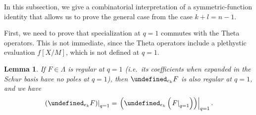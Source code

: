 \documentclass[reqno]{amsart}
\theoremstyle{plain}
\newtheorem{lemma}[theorem]{Lemma}
\theoremstyle{definition}
\theoremstyle{remark}
\let\oldTheta\Theta
\let\Theta\undefined
\DeclareMathOperator{\Theta}{\oldTheta}
\newcommand{\<}{\langle}
\renewcommand{\>}{\rangle}
\begin{document}
In this subsection, we give a combinatorial interpretation of a symmetric-function identity that allows us to prove the general case from the case $k+l=n-1$.


First, we need to prove that specialization at $q=1$ commutes with the Theta operators. This is not immediate, since the Theta operators include a plethystic evaluation $f[X/M]$, which is not defined at $q=1$.

\begin{lemma}
    \label{lem:theta_commutes_with_q1_eval}
    If $F \in \Lambda$ is regular at $q=1$ (i.e.\ its coefficients when expanded in the Schur basis have no poles at $q=1$), then $\Theta_{e_k} F$ is also regular at $q=1$, and we have
    \[ \left. \left( \Theta_{e_k} F \right) \right\rvert_{q=1} = \left. \left( \Theta_{e_k} \left( \left. F \right\rvert_{q=1} \right) \right) \right\rvert_{q=1}. \]
\end{lemma}
\end{document}

